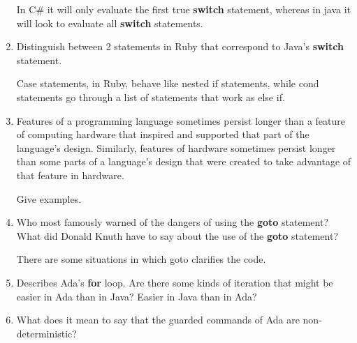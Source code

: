 \begin{enumerate}
\begin{answer}
    In C\# it will only evaluate the first true \textbf{switch} statement, whereas in java it will look to evaluate all \textbf{switch} statements.  

    \end{answer}

  \item Distinguish between 2 statements in Ruby
    that correspond to Java's \textbf{switch} statement.

    \begin{answer}

    Case statements, in Ruby, behave like nested if statements, while cond statements go through a list of statements that work as else if.
    
    \end{answer}

  \item Features of a programming language sometimes persist
    longer than a feature of computing hardware that inspired
    and supported that part of the language's design.
    Similarly, features of hardware sometimes persist longer
    than some parts of a language's design that were created
    to take advantage of that feature in hardware.

    Give examples.

    \begin{answer}
    
    \end{answer}

  \item Who most famously warned of the dangers of using the
    \textbf{goto} statement? What did Donald Knuth have to
    say about the use of the \textbf{goto} statement?

    \begin{answer}

    There are some situations in which goto clarifies the code.
    
    \end{answer}

  \item Describes Ada's \textbf{for} loop. Are there some
    kinds of iteration that might be easier in Ada than
    in Java? Easier in Java than in Ada?

    \begin{answer}



    \end{answer}

  \item What does it mean to say that the guarded commands
    of Ada are non-deterministic?


\end{enumerate}
